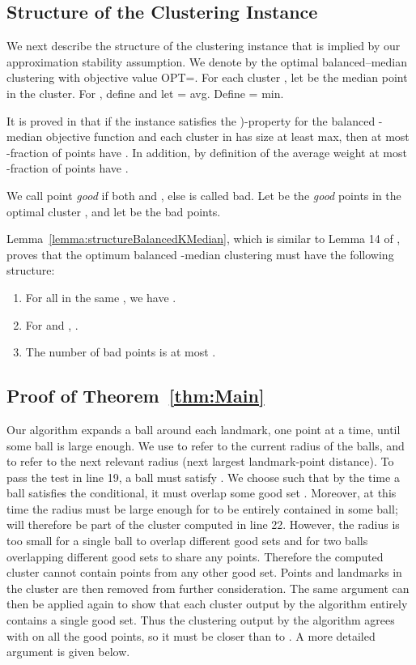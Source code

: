 \documentclass{llncs} \usepackage{algorithm}
\begin{document}
\subsection{Structure of the Clustering Instance}

We next describe the structure of the clustering instance that is implied by our approximation stability assumption.  We denote by  the optimal balanced--median clustering with objective value OPT=.  For each cluster , let  be the median point in the cluster.  For , define  and let  = avg.  Define  = min.

It is proved in \cite{bbg} that if the instance satisfies the )-property for the balanced -median objective function and each cluster in  has size at least max, then at most -fraction of points  have .  In addition, by definition of the average weight  at most -fraction of points  have .

We call point  \emph{good} if both  and , else  is called bad.  Let  be the \emph{good} points in the optimal cluster , and let  be the bad points.

Lemma~\ref{lemma:structureBalancedKMedian}, which is similar to Lemma 14 of \cite{bbg}, proves that the optimum balanced -median clustering must have the following structure:
\begin{enumerate}
\item For all  in the same , we have .
\item For  and , .
\item The number of bad points is at most .
\end{enumerate}

\subsection{Proof of Theorem~\ref{thm:Main}}

Our algorithm expands a ball around each landmark, one point at a time, until some ball is large enough.  We use  to refer to the current radius of the balls, and  to refer to the next relevant radius (next largest landmark-point distance).  To pass the test in line 19, a ball  must satisfy .  We choose  such that by the time a ball satisfies the conditional, it must overlap some good set .  Moreover, at this time the radius must be large enough for  to be entirely contained in some ball;  will therefore be part of the cluster computed in line 22.  However, the radius is too small for a single ball to overlap different good sets and for two balls overlapping different good sets to share any points.  Therefore the computed cluster cannot contain points from any other good set.  Points and landmarks in the cluster are then removed from further consideration.  The same argument can then be applied again to show that each cluster output by the algorithm entirely contains a single good set.  Thus the clustering output by the algorithm agrees with  on all the good points, so it must be closer than  to .  A more detailed argument is given below.
\end{document}
